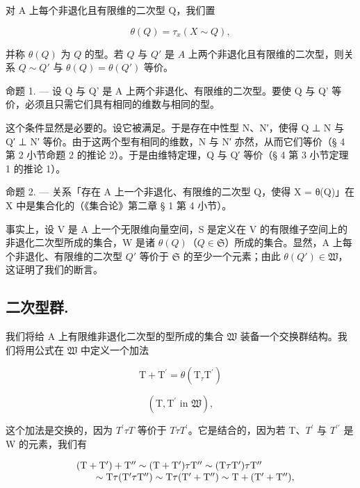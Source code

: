   对 A 上每个非退化且有限维的二次型 Q，我们置

\[
\theta (Q) = \tau_ {x} (X \sim Q),\tag{1}
\]

并称 \(\theta(Q)\) 为 \(Q\) 的型。若 \(Q\) 与 \(Q'\) 是 \(A\) 上两个非退化且有限维的二次型，则关系 \(Q \sim Q'\) 与 \(\theta(Q) = \theta(Q')\) 等价。

命题 1. --- 设 Q 与 Q' 是 A 上两个非退化、有限维的二次型。要使 Q 与 Q' 等价，必须且只需它们具有相同的维数与相同的型。

  这个条件显然是必要的。设它被满足。于是存在中性型 N、N′，使得 Q ⊥ N 与 Q′ ⊥ N′ 等价。由于这两个型有相同的维数，N 与 N′ 亦然，从而它们等价（§ 4 第 2 小节命题 2 的推论 2）。于是由维特定理，Q 与 Q′ 等价（§ 4 第 3 小节定理 1 的推论 1）。

命题 2. --- 关系「存在 A 上一个非退化、有限维的二次型 Q，使得 X = θ(Q)」在 X 中是集合化的（《集合论》第二章 § 1 第 4 小节）。

  事实上，设 V 是 A 上一个无限维向量空间，S 是定义在 V 的有限维子空间上的非退化二次型所成的集合，W 是诸 \(\theta(Q)\)（\(Q \in \mathfrak{S}\)）所成的集合。显然，A 上每个非退化、有限维的二次型 \(Q'\) 等价于 \(\mathfrak{S}\) 的至少一个元素；由此 \(\theta(Q') \in \mathfrak{W}\)，这证明了我们的断言。

\subsection{二次型群.}

  我们将给 A 上有限维非退化二次型的型所成的集合 \(\mathfrak{W}\) 装备一个交换群结构。我们将用公式在 \(\mathfrak{W}\) 中定义一个加法

\[
\mathrm{T} + \mathrm{T} ^ {\prime} = \theta (\mathrm{T} _ {\tau} \mathrm{T} ^ {\prime})\tag{2}
\]

\[
(\mathrm{T}, \mathrm{T} ^ {\prime} \text {   in   } \mathfrak {W}),
\]

  这个加法是交换的，因为 \(T^{\prime} \tau T\) 等价于 \(T \tau T^{\prime}\)。它是结合的，因为若 T、\(T^{\prime}\) 与 \(T^{\prime\prime}\) 是 W 的元素，我们有

\[
\begin{array}{r l} & (\mathrm{T} + \mathrm{T} ^ {\prime}) + \mathrm{T} ^ {\prime \prime} \sim (\mathrm{T} + \mathrm{T} ^ {\prime}) \tau \mathrm{T} ^ {\prime \prime} \sim (\mathrm{T} \tau \mathrm{T} ^ {\prime}) \tau \mathrm{T} ^ {\prime \prime} \\ & \qquad \sim \mathrm{T} \tau (\mathrm{T} ^ {\prime} \tau \mathrm{T} ^ {\prime \prime}) \sim \mathrm{T} \tau (\mathrm{T} ^ {\prime} + \mathrm{T} ^ {\prime \prime}) \sim \mathrm{T} + (\mathrm{T} ^ {\prime} + \mathrm{T} ^ {\prime \prime}), \end{array}
\]


